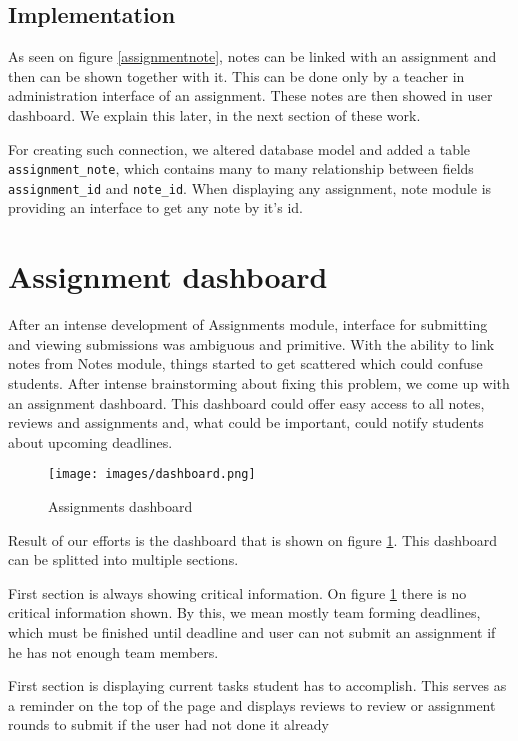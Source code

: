 \subsection{Implementation}
As seen on figure \ref{assignmentnote}, notes can be linked with an assignment and then can be shown together with it. This can be done only by a teacher in administration interface of an assignment. These notes are then showed in user dashboard. We explain this later, in the next section of these work.


For creating such connection, we altered database model and added a table \texttt{assignment\_note}, which contains many to many relationship between fields \texttt{assignment\_id} and \texttt{note\_id}. When displaying any assignment, note module is providing an interface to get any note by it's id.


\section{Assignment dashboard}

After an intense development of Assignments module, interface for submitting and viewing submissions was ambiguous and primitive. With the ability to link notes from Notes module, things started to get scattered which could confuse students. After intense brainstorming about fixing this problem, we come up with an assignment dashboard. This dashboard could offer easy access to all notes, reviews and assignments and, what could be important, could notify students about upcoming deadlines.

\begin{figure}[h]
    \centering
    \texttt{[image: images/dashboard.png]}
    \caption{Assignments dashboard}
    \label{fig:assignments_dashboard}
\end{figure}

Result of our efforts is the dashboard that is shown on figure \ref{fig:assignments_dashboard}. This dashboard can be splitted into multiple sections.

First section is always showing critical information. On figure \ref{fig:assignments_dashboard} there is no critical information shown. By this, we mean mostly team forming deadlines, which must be finished until deadline and user can not submit an assignment if he has not enough team members.

First section is displaying current tasks student has to accomplish. This serves as a reminder on the top of the page and displays reviews to review or assignment rounds to submit if the user had not done it already

